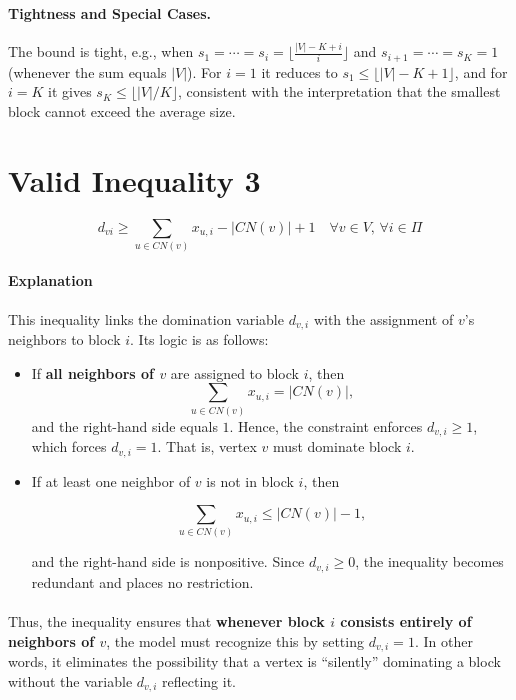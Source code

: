 \paragraph{Tightness and Special Cases.}
The bound is tight, e.g., when $s_1=\cdots=s_i=\big\lfloor \frac{|V|-K+i}{i} \big\rfloor$
and $s_{i+1}=\cdots=s_K=1$ (whenever the sum equals $|V|$). For $i=1$ it reduces to
$s_1 \le \lfloor |V|-K+1 \rfloor$, and for $i=K$ it gives
$s_K \le \lfloor |V|/K \rfloor$, consistent with the interpretation that the smallest
block cannot exceed the average size.

\section{Valid Inequality 3}
\begin{equation}
    d_{vi} \geq \sum_{u \in CN(v)} x_{u,i} - |CN(v)| + 1 \quad \forall v \in V,\, \forall i \in \Pi
\end{equation}
\paragraph{Explanation} This inequality links the domination variable $d_{v,i}$ with the assignment of $v$’s neighbors to block $i$. Its logic is as follows:
 
\begin{itemize}

    \item If \textbf{all neighbors of $v$} are assigned to block $i$, then
    \[
    \sum_{u \in CN(v)} x_{u,i} = |CN(v)|,
    \]
    and the right-hand side equals $1$. Hence, the constraint enforces $d_{v,i} \ge 1$, which forces $d_{v,i} = 1$. That is, vertex $v$ must dominate block $i$.
 
    \item If at least one neighbor of $v$ is not in block $i$, then

    \[
    \sum_{u \in CN(v)} x_{u,i} \le |CN(v)|-1,
    \]

    and the right-hand side is nonpositive. Since $d_{v,i} \ge 0$, the inequality becomes redundant and places no restriction.

\end{itemize}
 
\paragraph{} Thus, the inequality ensures that \textbf{whenever block $i$ consists entirely of neighbors of $v$}, the model must recognize this by setting $d_{v,i}=1$. In other words, it eliminates the possibility that a vertex is ``silently'' dominating a block without the variable $d_{v,i}$ reflecting it.

